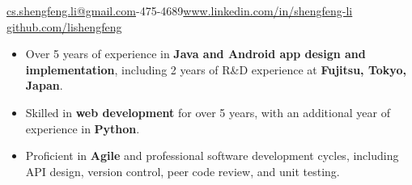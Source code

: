 \documentclass[10pt,a4paper]{article}
\begin{document}
\sloppy  %



\nobreakvspace{0.3em}  %

\noindent\href{mailto:cs.shengfeng.li@gmail.com}{cs.shengfeng.li@gmail.com}-475-4689\sbull\href{https://www.linkedin.com/in/shengfeng-li/}{www.linkedin.com/in/shengfeng-li}\sbull
\href{https://github.com/lishengfeng}{github.com/lishengfeng}

\spacedhrule{0em}{-1em}  %
\begin{itemize}
\setlength{\itemsep}{0.1em}
\item Over 5 years of experience in \textbf{Java and Android app design and implementation}, including 2 years of R\&D experience at \textbf{Fujitsu, Tokyo, Japan}.
\item Skilled in \textbf{web development} for over 5 years, with an additional year of experience in \textbf{Python}.
\item Proficient in \textbf{Agile} and professional software development cycles, including API design, version control, peer code review, and unit testing.
\end{itemize}


\end{document}
